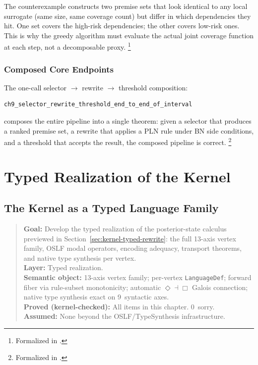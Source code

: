 \documentclass[11pt,openany]{report}
\begin{document}
\noindent
The counterexample constructs two premise sets that look identical to any
local surrogate (same size, same coverage count) but differ in which
dependencies they hit.  One set covers the high-risk dependencies; the
other covers low-risk ones.  This is why the greedy algorithm must
evaluate the actual joint coverage function at each step, not a
decomposable proxy.%
\footnote{Formalized in .}

\section{Composed Core Endpoints}

The one-call selector $\to$ rewrite $\to$ threshold composition:
\begin{lstlisting}
ch9_selector_rewrite_threshold_end_to_end_of_interval
\end{lstlisting}

composes the entire pipeline into a single theorem: given a selector that
produces a ranked premise set, a rewrite that applies a PLN rule under
BN side conditions, and a threshold that accepts the result, the composed
pipeline is correct.%
\footnote{Formalized in .}


\part{Typed Realization of the Kernel}
\label{part:ntt}

\chapter{The Kernel as a Typed Language Family}
\label{ch:wm-gslt}

\begin{quote}\small
\textbf{Goal:} Develop the typed realization of the posterior-state calculus
previewed in Section~\ref{sec:kernel-typed-rewrite}: the full 13-axis vertex
family, OSLF modal operators, encoding adequacy, transport theorems, and
native type synthesis per vertex.\\
\textbf{Layer:} Typed realization.\\
\textbf{Semantic object:} 13-axis vertex family; per-vertex \texttt{LanguageDef};
forward fiber via rule-subset monotonicity; automatic $\Diamond\dashv\Box$
Galois connection; native type synthesis exact on 9~syntactic axes.\\
\textbf{Proved (kernel-checked):} All items in this chapter.  0~sorry.\\
\textbf{Assumed:} None beyond the OSLF/TypeSynthesis infrastructure.
\end{quote}
\end{document}
